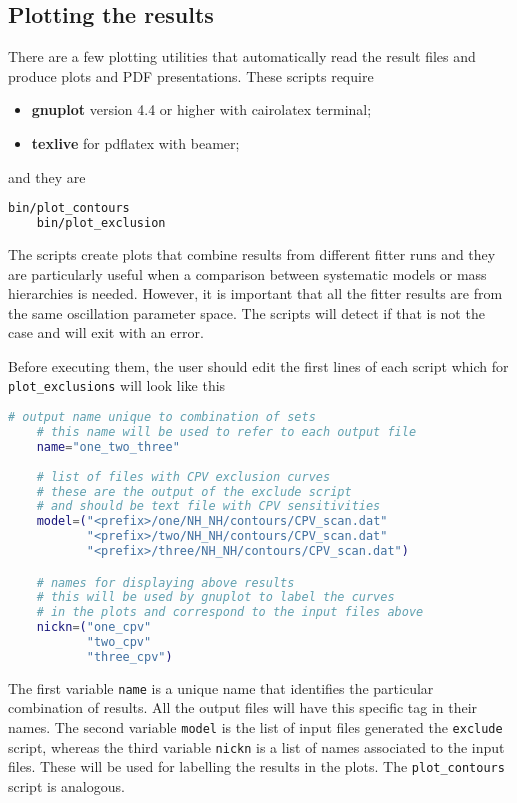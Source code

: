 \documentclass[a4paper, 11pt]{article}
\begin{document}
\subsection{Plotting the results}
\label{sec:plot}

There are a few plotting utilities that automatically read the result files %
and produce plots and PDF presentations.
These scripts require
\begin{itemize}
		\small
	\item \textbf{gnuplot} version 4.4 or higher with cairolatex terminal;
	\item \textbf{texlive} for pdflatex with beamer;
\end{itemize}
and they are
\begin{lstlisting}[language=bash]
    bin/plot_contours
    bin/plot_exclusion
\end{lstlisting}
The scripts create plots that combine results from different fitter runs and they are particularly useful %
when a comparison between systematic models or mass hierarchies is needed.
However, it is important that all the fitter results are from the same oscillation parameter space.
The scripts will detect if that is not the case and will exit with an error.

Before executing them, the user should edit the first lines of each script which for %
\texttt{plot\_exclusions} will look like this %

\begin{lstlisting}[language=bash]
    # output name unique to combination of sets
    # this name will be used to refer to each output file
    name="one_two_three"
    
    # list of files with CPV exclusion curves
    # these are the output of the exclude script
    # and should be text file with CPV sensitivities
    model=("<prefix>/one/NH_NH/contours/CPV_scan.dat"
           "<prefix>/two/NH_NH/contours/CPV_scan.dat"
           "<prefix>/three/NH_NH/contours/CPV_scan.dat")

    # names for displaying above results
    # this will be used by gnuplot to label the curves
    # in the plots and correspond to the input files above
    nickn=("one_cpv"
           "two_cpv"
           "three_cpv")
\end{lstlisting}
The first variable \texttt{name} is a unique name that identifies the particular combination of results.
All the output files will have this specific tag in their names.
The second variable \texttt{model} is the list of input files generated the \texttt{exclude} script, %
whereas the third variable \texttt{nickn} is a list of names associated to the input files.
These will be used for labelling the results in the plots.
The \texttt{plot\_contours} script is analogous.
\end{document}
